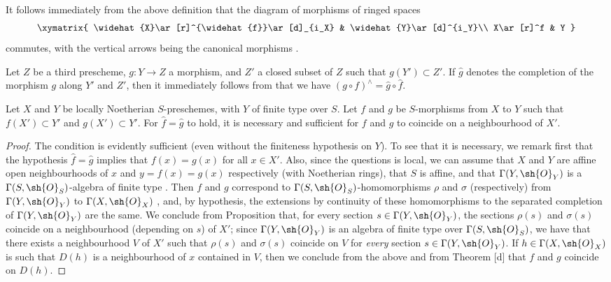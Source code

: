 \begin{env}[10.9.2]
\label{I.10.9.2}
It follows immediately from the above definition that the diagram of morphisms of ringed spaces
\[
  \xymatrix{
    \widehat{X}\ar[r]^{\widehat{f}}\ar[d]_{i_X} &
    \widehat{Y}\ar[d]^{i_Y}\\
    X\ar[r]^f &
    Y
  }
\]
commutes, with the vertical arrows being the canonical morphisms .
\end{env}

\begin{env}[10.9.3]
\label{I.10.9.3}
Let $Z$ be a third prescheme, $g:Y\to Z$ a morphism, and $Z'$ a closed subset of $Z$ such that $g(Y')\subset Z'$.
If $\widehat{g}$ denotes the completion of the morphism $g$ along $Y'$ and $Z'$, then it immediately follows from  that we have $(g\circ f)^\wedge=\widehat{g}\circ\widehat{f}$.
\end{env}

\begin{proposition}[10.9.4]
\label{I.10.9.4}
Let $X$ and $Y$ be locally Noetherian $S$-preschemes, with $Y$ of finite type over $S$.
Let $f$ and $g$ be $S$-morphisms from $X$ to $Y$ such that $f(X')\subset Y'$ and $g(X')\subset Y'$.
For $\widehat{f}=\widehat{g}$ to hold, it is necessary and sufficient for $f$ and $g$ to coincide on a neighbourhood of $X'$.
\end{proposition}

\begin{proof}
The condition is evidently sufficient (even without the finiteness hypothesis on $Y$).
To see that it is necessary, we remark first that the hypothesis $\widehat{f}=\widehat{g}$ implies that $f(x)=g(x)$ for all $x\in X'$.
Also, since the questions is local, we can assume that $X$ and $Y$ are affine open neighbourhoods of $x$ and $y=f(x)=g(x)$ respectively (with Noetherian rings), that $S$ is affine, and that $\Gamma(Y,\sh{O}_Y)$ is a $\Gamma(S,\sh{O}_S)$-algebra of finite type .
Then $f$ and $g$ correspond to $\Gamma(S,\sh{O}_S)$-homomorphisms $\rho$ and $\sigma$ (respectively) from $\Gamma(Y,\sh{O}_Y)$ to $\Gamma(X,\sh{O}_X)$ , and, by hypothesis, the extensions by continuity of these homomorphisms to the separated completion of $\Gamma(Y,\sh{O}_Y)$ are the same.
We conclude from Proposition  that, for every section $s\in\Gamma(Y,\sh{O}_Y)$, the sections $\rho(s)$ and $\sigma(s)$ coincide on a neighbourhood (depending on $s$) of $X'$; since $\Gamma(Y,\sh{O}_Y)$ is an algebra of finite type over $\Gamma(S,\sh{O}_S)$, we have that there exists a neighbourhood $V$ of $X'$ such that $\rho(s)$ and $\sigma(s)$ coincide on $V$ for \emph{every} section $s\in\Gamma(Y,\sh{O}_Y)$.
If $h\in\Gamma(X,\sh{O}_X)$ is such that $D(h)$ is a neighbourhood of $x$ contained in $V$, then we conclude from the above and from Theorem [d] that $f$ and $g$ coincide on $D(h)$.
\end{proof}

